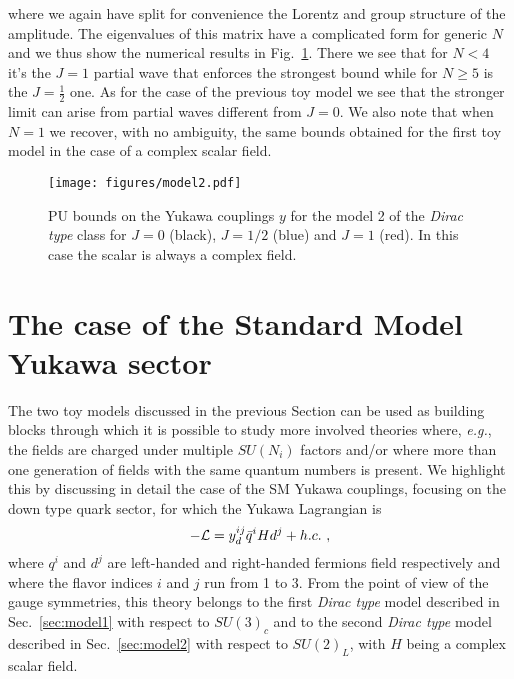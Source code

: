 \documentclass[a4paper,11pt]{article}
\newcommand{\be}{\begin{equation}}
\newcommand{\ee}{\end{equation}}
\begin{document}
where we again have split for convenience the Lorentz and group structure of the amplitude. The eigenvalues of this matrix have a complicated form for generic $N$ and we thus show the numerical results in Fig.~\ref{fig:model2}. There we see that for $N<4$ it's the $J=1$ partial wave that enforces the strongest bound while for $N\ge 5$ is the $J=\frac{1}{2}$ one.  As for the case of the previous toy model we see that the stronger limit can arise from partial waves different from $J=0$. We also note that when $N=1$ we recover, with no ambiguity, the same bounds obtained for the first toy model in the case of a complex scalar field.



\begin{figure}[t!]
\begin{center}
\texttt{[image: figures/model2.pdf]} 
\caption{\small PU bounds on the Yukawa couplings $y$ for the model 2 of the {\emph{Dirac type}} class
for $J=0$ (black), $J=1/2$ (blue) and $J=1$ (red).
In this case the scalar is always a complex field. }
\label{fig:model2}
\end{center}
\end{figure}


\section{The case of the Standard Model Yukawa sector}\label{sec:sm_yuk}

The two toy models discussed in the previous Section can be used as building blocks through which it is possible to study more involved theories where, {\emph{e.g.}}, the fields are charged under multiple $SU(N_i)$ factors and/or where more than one generation of fields with the same quantum numbers is present. We highlight this by discussing in detail the case of the SM Yukawa couplings, focusing on the down type quark sector, for which the Yukawa Lagrangian is
\be\label{eq:sm_yuk}
-{\cal L} = y_d^{ij} \bar q^i H d^j + h.c. \ ,
\ee
where $q^i$ and $d^j$ are left-handed and right-handed fermions field respectively and where the flavor indices $i$ and $j$ run from 1 to 3. From the point of view of the gauge symmetries,
this theory belongs to the first {\emph{Dirac type}} model described in Sec.~\ref{sec:model1}  with respect to $SU(3)_c$ and to the second  {\emph{Dirac type}} model described in Sec.~\ref{sec:model2} with respect to $SU(2)_L$, with $H$ being a complex scalar field. 
\end{document}
